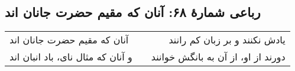 \begin{center}
\section*{رباعی شمارهٔ ۶۸: آنان که مقیم حضرت جانان اند}
\label{sec:068}
\begin{longtable}{l p{0.5cm} r}
آنان که مقیم حضرت جانان اند
&&
یادش نکنند و بر زبان کم رانند
\\
و آنان که مثال نای، باد انبان اند
&&
دورند از او، از آن به بانگش خوانند
\\
\end{longtable}
\end{center}
